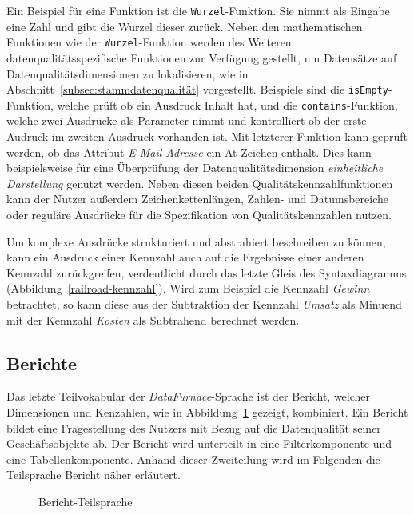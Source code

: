 \documentclass[
  language=german, %
  type=bachelor,%
  ngerman
]{isthesis}
\begin{document}
\begin{content}
	Ein Beispiel für eine Funktion ist die \texttt{Wurzel}-Funktion.  Sie nimmt
	als Eingabe eine Zahl und gibt die Wurzel dieser zurück. Neben den
	mathematischen Funktionen wie der \texttt{Wurzel}-Funktion werden des
	Weiteren datenqualitätsspezifische Funktionen zur Verfügung gestellt, um
	Datensätze auf Datenqualitätsdimensionen zu lokalisieren, wie in
	Abschnitt~\ref{subsec:stammdatenqualität} vorgestellt.  Beispiele sind die
	\texttt{isEmpty}-Funktion, welche prüft ob ein Ausdruck Inhalt hat, und die
	\texttt{contains}-Funktion, welche zwei Ausdrücke als Parameter nimmt und
	kontrolliert ob der erste Audruck im zweiten Ausdruck vorhanden ist. Mit
	letzterer Funktion kann \zB{} geprüft werden, ob das Attribut
	\textit{E-Mail-Adresse} ein At-Zeichen enthält. Dies kann beispielsweise für
	eine Überprüfung der Datenqualitätsdimension \textit{einheitliche
	Darstellung} genutzt werden. Neben diesen beiden Qualitätskennzahlfunktionen
	kann der Nutzer außerdem Zeichenkettenlängen, Zahlen- und Datumsbereiche oder
	reguläre Ausdrücke für die Spezifikation von Qualitätskennzahlen nutzen.

  Um komplexe Ausdrücke strukturiert und abstrahiert beschreiben zu können,
  kann ein Ausdruck einer Kennzahl auch auf die Ergebnisse einer anderen
  Kennzahl zurückgreifen, verdeutlicht durch das letzte Gleis des
  Syntaxdiagramms (Abbildung~\ref{railroad-kennzahl}). Wird zum Beispiel die
  Kennzahl \textit{Gewinn} betrachtet, so kann diese aus der Subtraktion der
  Kennzahl \textit{Umsatz} als Minuend mit der Kennzahl \textit{Kosten} als
  Subtrahend berechnet werden.


  \subsection{Berichte}

  Das letzte Teilvokabular der \textit{DataFurnace}-Sprache ist der Bericht,
  welcher Dimensionen und Kenzahlen, wie in
  Abbildung~\ref{language_spec-erm-bericht} gezeigt, kombiniert. Ein Bericht
  bildet eine Fragestellung des Nutzers mit Bezug auf die Datenqualität seiner
  Geschäftsobjekte ab. Der Bericht wird unterteilt in eine Filterkomponente und
  eine Tabellenkomponente. Anhand dieser Zweiteilung wird im Folgenden die
  Teilsprache Bericht näher erläutert.

  \begin{figure}
    \resizebox{120px}{!}{}
    \caption{Bericht-Teilsprache}\label{language_spec-erm-bericht}
  \end{figure}
  

\end{content}
\end{document}
